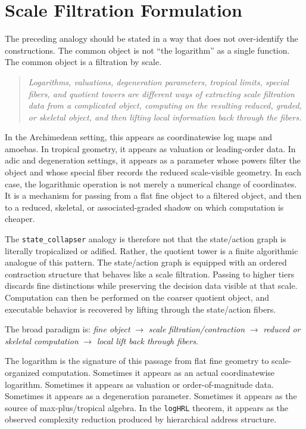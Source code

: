 \documentclass[11pt]{article}
\newcommand{\SC}{\texttt{state\_collapser}}
\newcommand{\logHRL}{\texttt{logHRL}}
\newenvironment{claimbox}
  {\begin{quote}\itshape}
  {\end{quote}}
\begin{document}
\section{Scale Filtration Formulation}

The preceding analogy should be stated in a way that does not over-identify the
constructions. The common object is not ``the logarithm'' as a single function.
The common object is a filtration by scale.

\begin{claimbox}
Logarithms, valuations, degeneration parameters, tropical limits, special
fibers, and quotient towers are different ways of extracting scale filtration
data from a complicated object, computing on the resulting reduced, graded, or
skeletal object, and then lifting local information back through the fibers.
\end{claimbox}

In the Archimedean setting, this appears as coordinatewise log maps and
amoebas. In tropical geometry, it appears as valuation or leading-order data.
In adic and degeneration settings, it appears as a parameter whose powers
filter the object and whose special fiber records the reduced scale-visible
geometry. In each case, the logarithmic operation is not merely a numerical
change of coordinates. It is a mechanism for passing from a flat fine object to
a filtered object, and then to a reduced, skeletal, or associated-graded shadow
on which computation is cheaper.

The \SC{} analogy is therefore not that the state/action graph is literally
tropicalized or adified. Rather, the quotient tower is a finite algorithmic
analogue of this pattern. The state/action graph is equipped with an ordered
contraction structure that behaves like a scale filtration. Passing to higher
tiers discards fine distinctions while preserving the decision data visible at
that scale. Computation can then be performed on the coarser quotient object,
and executable behavior is recovered by lifting through the state/action
fibers.

The broad paradigm is: {\em fine object}
$\to$
{\em scale filtration/contraction}
$\to$
{\em reduced or skeletal computation}
$\to$
{\em local lift back through fibers}.

The logarithm is the signature of this passage from flat fine geometry to
scale-organized computation. Sometimes it appears as an actual coordinatewise
logarithm. Sometimes it appears as valuation or order-of-magnitude data.
Sometimes it appears as a degeneration parameter. Sometimes it appears as the
source of max-plus/tropical algebra. In the \logHRL{} theorem, it appears as
the observed complexity reduction produced by hierarchical address structure.
\end{document}
